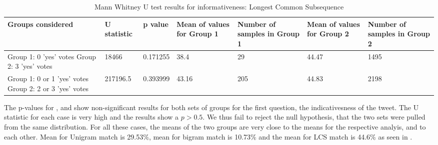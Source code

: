 \begin{table}[!htbp]
\centering
\caption{Mann Whitney U test results for informativeness: Longest Common Subsequence}
\label{tab:lcscorr2}
\begin{tabular}{|p{}|p{}|p{}|p{}|p{}|p{}|p{}|}
\hline
Groups considered    & U statistic & p value & Mean of values for Group 1 & Number of samples in Group 1 & Mean of values for Group 2 & Number of samples in Group 2\\ \hline
Group 1: 0 'yes' votes \newline Group 2: 3 'yes' votes & 18466   & 0.171255 & 38.4 & 29 & 44.47  & 1495 \\ \hline
Group 1: 0 or 1 'yes' votes \newline Group 2: 2 or 3 'yes' votes & 217196.5      &  0.393999    & 43.16    & 205 & 44.83   &  2198\\ \hline
\end{tabular}
\end{table}

The p-values for ,  and  show non-significant results for both sets of groups for the first question, the indicativesness of the tweet. The U statistic for each case is very high and the results show a $p>0.5$. We thus fail to reject the null hypothesis, that the two sets were pulled from the same distribution. For all these cases, the means of the two groups are very close to the means for the respective analyis, and to each other. Mean for Unigram match is 29.53\%, mean for bigram match is 10.73\% and the mean for LCS match is 44.6\% as seen in . 

